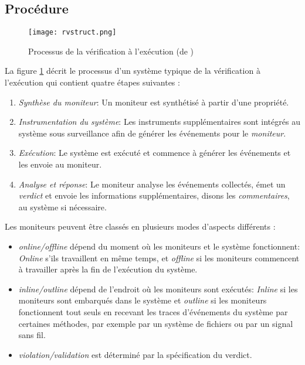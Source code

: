 \subsection{Procédure}

\begin{figure}[h]
\begin{center}
\centering
\texttt{[image: rvstruct.png]}
\caption{Processus de la vérification à l'exécution (de \cite{falcone2013tutorial})}
\label{img:rvstruct}
\end{center}
\end{figure}

La figure \ref{img:rvstruct} décrit le processus d'un système typique de la vérification à l'exécution qui contient quatre étapes suivantes \citep{falcone2013tutorial}:
\begin{enumerate}
\item \emph{Synthèse du moniteur}: Un moniteur est synthétisé à partir d'une propriété.
\item \emph{Instrumentation du système}: Les instruments supplémentaires sont intégrés au système sous surveillance afin de générer les événements pour le \emph{moniteur}.
\item \emph{Exécution}: Le système est exécuté et commence à générer les événements et les envoie au moniteur.
\item \emph{Analyse et réponse}: Le moniteur analyse les événements collectés, émet un \emph{verdict} et envoie les informations supplémentaires, disons les \emph{commentaires}, au système si nécessaire.
\end{enumerate}

Les moniteurs peuvent être classés en plusieurs modes d'aspects différents \citep{chen2007mop}:
\begin{itemize}
\item \emph{online/offline} dépend du moment où les moniteurs et le système fonctionnent: \emph{Online} s'ils travaillent en même temps, et \emph{offline} si les moniteurs commencent à travailler après la fin de l'exécution du système.
\item \emph{inline/outline} dépend de l'endroit où les moniteurs sont exécutés: \emph{Inline} si les moniteurs sont embarqués dans le système et \emph{outline} si les moniteurs fonctionnent tout seuls en recevant les traces d'événements du système par certaines méthodes, par exemple par un système de fichiers ou par un signal sans fil.
\item \emph{violation/validation} est déterminé par la spécification du verdict.
\end{itemize}

